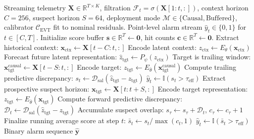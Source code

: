 \begin{algorithm}[t]
\caption{Streaming Anomaly Scoring and Decision Calibration}
\label{alg:scoring_protocol}
\begin{algorithmic}[1]
\Require Streaming telemetry $\mathbf{X} \in \mathbb{R}^{T \times K}$, filtration $\mathcal{F}_t = \sigma(\mathbf{X}[1:t, :])$, context horizon $C=256$, suspect horizon $S=64$, deployment mode $\mathcal{M} \in \{\text{Causal}, \text{Buffered}\}$, calibrator $\mathcal{C}_{\text{EVT}}$ fit to nominal residuals.
\Ensure Point-level alarm stream $\hat{y}_t \in \{0, 1\}$ for $t \in [C, T]$.
\State Initialize score buffer $\mathbf{s} \in \mathbb{R}^T \leftarrow \mathbf{0}$, hit counts $\mathbf{c} \in \mathbb{R}^T \leftarrow \mathbf{0}$.
    \State Extract historical context: $\mathbf{x}_{\text{ctx}} \leftarrow \mathbf{X}[t - C : t, :]$ 
    \State Encode latent context: $z_{\text{ctx}} \leftarrow E_\theta(\mathbf{x}_{\text{ctx}})$
    \State Forecast future latent representation: $\hat{z}_{\text{tgt}} \leftarrow P_\psi(z_{\text{ctx}})$
        \State Target is trailing window: $\mathbf{x}_{\text{tgt}}^{\text{causal}} \leftarrow \mathbf{X}[t - S : t, :]$ 
        \State Encode target: $z_{\text{tgt}} \leftarrow E_{\bar{\theta}}(\mathbf{x}_{\text{tgt}}^{\text{causal}})$
        \State Compute trailing predictive discrepancy: $s_t \leftarrow \mathcal{D}_{\text{sal}}(\hat{z}_{\text{tgt}} - z_{\text{tgt}})$
        \State $\hat{y}_t \leftarrow \mathbb{I}(s_t > \tau_{\text{eff}})$ 
        \State Extract prospective suspect horizon: $\mathbf{x}_{\text{tgt}} \leftarrow \mathbf{X}[t : t + S, :]$ 
        \State Encode target representation: $z_{\text{tgt}} \leftarrow E_{\bar{\theta}}(\mathbf{x}_{\text{tgt}})$
        \State Compute forward predictive discrepancy: $\mathcal{D}_t \leftarrow \mathcal{D}_{\text{sal}}(\hat{z}_{\text{tgt}} - z_{\text{tgt}})$
            \State Accumulate suspect overlap: $s_\tau \leftarrow s_\tau + \mathcal{D}_t$, \quad $c_\tau \leftarrow c_\tau + 1$
        \EndFor
        \State Finalize running average score at step $t$: $\bar{s}_t \leftarrow s_t / \max(c_t, 1)$
        \State $\hat{y}_t \leftarrow \mathbb{I}(\bar{s}_t > \tau_{\text{eff}})$ 
    \EndIf
\EndFor
\State \Return Binary alarm sequence $\hat{\mathbf{y}}$
\end{algorithmic}
\end{algorithm}


